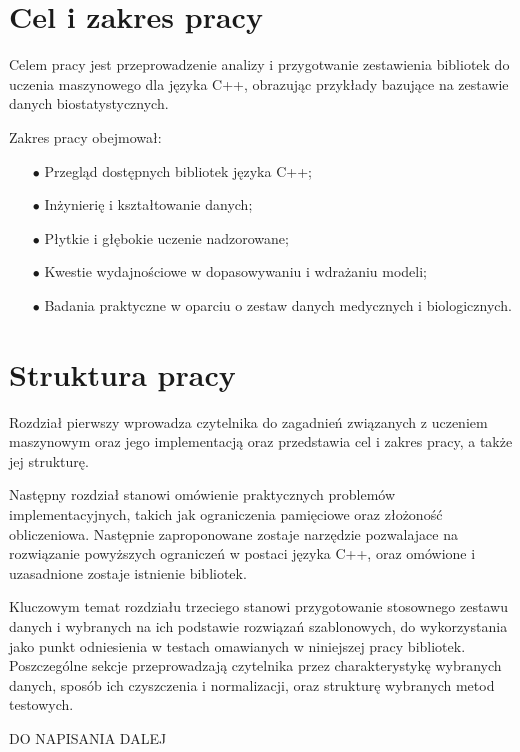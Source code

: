 \section{Cel i zakres pracy} %

Celem pracy jest przeprowadzenie analizy i przygotwanie zestawienia bibliotek do uczenia maszynowego dla języka C++, obrazując przykłady bazujące na zestawie danych biostatystycznych.

Zakres pracy obejmował:

\begin{itemize}
    \item [$\bullet$] Przegląd dostępnych bibliotek języka C++;
    \item [$\bullet$] Inżynierię i kształtowanie danych;
    \item [$\bullet$] Płytkie i głębokie uczenie nadzorowane;
    \item [$\bullet$] Kwestie wydajnościowe w dopasowywaniu i wdrażaniu modeli;
    \item [$\bullet$] Badania praktyczne w oparciu o zestaw danych medycznych i biologicznych.
\end{itemize}

\section{Struktura pracy} %

Rozdział pierwszy wprowadza czytelnika do zagadnień związanych z uczeniem maszynowym oraz jego implementacją oraz przedstawia cel i zakres pracy, a także jej strukturę.

Następny rozdział stanowi omówienie praktycznych problemów implementacyjnych, takich jak ograniczenia pamięciowe oraz złożoność obliczeniowa. Następnie zaproponowane zostaje narzędzie pozwalajace na rozwiązanie powyższych ograniczeń w postaci języka C++, oraz omówione i uzasadnione zostaje istnienie bibliotek. 

Kluczowym temat rozdziału trzeciego stanowi przygotowanie stosownego zestawu danych i wybranych na ich podstawie rozwiązań szablonowych, do wykorzystania jako punkt odniesienia w testach omawianych w niniejszej pracy bibliotek. Poszczególne sekcje przeprowadzają czytelnika przez charakterystykę wybranych danych, sposób ich czyszczenia i normalizacji, oraz strukturę wybranych metod testowych. 

DO NAPISANIA DALEJ